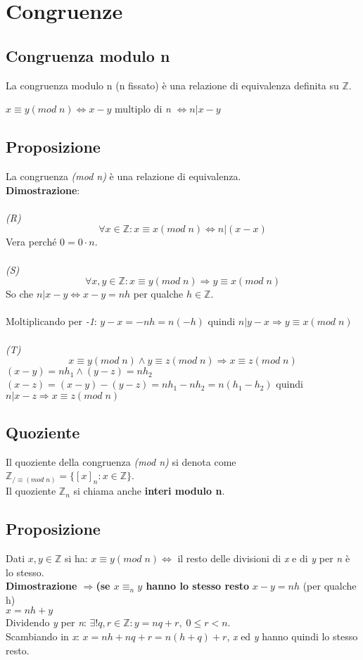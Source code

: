 \section{Congruenze}

\subsection{Congruenza modulo n}
La congruenza modulo n (n fissato) è una relazione di equivalenza definita su \(\mathbb{Z}\).

\(x\equiv y(mod\; n)\Leftrightarrow x-y\) multiplo di \textit{n} \(\Leftrightarrow n|x-y\)

\subsection{Proposizione}
La congruenza \textit{(mod n)} è una relazione di equivalenza.
\\
\textbf{Dimostrazione}:
\\\\
\textit{(R)} \[\forall x\in\mathbb{Z}: x\equiv x(mod\; n)\Leftrightarrow n|(x-x)\]
Vera perché \(0=0\cdot n\).
\\\\
\textit{(S)}
\[\forall x,y\in\mathbb{Z}: x\equiv y(mod\; n)\Rightarrow y\equiv x(mod\; n)\]
So che \(n|x-y\Leftrightarrow x-y=nh\) per qualche \(h\in\mathbb{Z}\).
\\\\
Moltiplicando per \textit{-1}: \(y-x=-nh=n(-h)\) quindi \(n|y-x\Rightarrow y\equiv x(mod\;n)\)
\\\\
\textit{(T)}
\[x\equiv y(mod\;n)\land y\equiv z(mod\;n)\Rightarrow x\equiv z(mod\;n)\]
\((x-y)=nh_1 \land (y-z)=nh_2\)
\\
\((x-z)=(x-y)-(y-z)=nh_1-nh_2=n(h_1-h_2)\) quindi \(n|x-z\Rightarrow x\equiv z(mod\;n)\)

\subsection{Quoziente}
Il quoziente della congruenza \textit{(mod n)} si denota come \(\mathbb{Z}_{/ \equiv (mod\;n)}=\{[x]_n:x\in\mathbb{Z}\}\).
\\
Il quoziente \(\mathbb{Z}_n\) si chiama anche \textbf{interi modulo n}.

\subsection{Proposizione}
Dati \(x,y\in\mathbb{Z}\) si ha: \(x\equiv y(mod\;n)\Leftrightarrow\) il resto delle divisioni di \textit{x} e di \textit{y} per \textit{n} è lo stesso.
\\
\textbf{Dimostrazione \(\Rightarrow\)(se \(x\equiv _n y\) hanno lo stesso resto}
\(x-y=nh\) (per qualche h)\\
\(x=nh+y\)\\
Dividendo \textit{y} per \textit{n}: \(\exists !q,r\in\mathbb{Z} : y=nq+r,\; 0\leq r<n\).
\\
Scambiando in \textit{x}: \(x=nh+nq+r=n(h+q)+r\), \textit{x} ed \textit{y} hanno quindi lo stesso resto.

